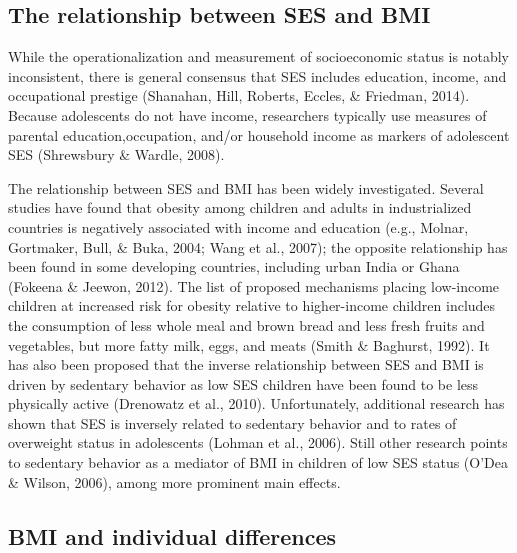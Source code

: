 \documentclass[man]{apa6}
\begin{document}
\hypertarget{the-relationship-between-ses-and-bmi}{%
\subsection{The relationship between SES and BMI}\label{the-relationship-between-ses-and-bmi}}

While the operationalization and measurement of socioeconomic status is notably inconsistent, there is general consensus that SES includes education, income, and occupational prestige (Shanahan, Hill, Roberts, Eccles, \& Friedman, 2014). Because adolescents do not have income, researchers typically use measures of parental education,occupation, and/or household income as markers of adolescent SES (Shrewsbury \& Wardle, 2008).

The relationship between SES and BMI has been widely investigated. Several studies have found that obesity among children and adults in industrialized countries is negatively associated with income and education (e.g., Molnar, Gortmaker, Bull, \& Buka, 2004; Wang et al., 2007); the opposite relationship has been found in some developing countries, including urban India or Ghana (Fokeena \& Jeewon, 2012). The list of proposed mechanisms placing low-income children at increased risk for obesity relative to higher-income children includes the consumption of less whole meal and brown bread and less fresh fruits and vegetables, but more fatty milk, eggs, and meats (Smith \& Baghurst, 1992). It has also been proposed that the inverse relationship between SES and BMI is driven by sedentary behavior as low SES children have been found to be less physically active (Drenowatz et al., 2010). Unfortunately, additional research has shown that SES is inversely related to sedentary behavior and to rates of overweight status in adolescents (Lohman et al., 2006). Still other research points to sedentary behavior as a mediator of BMI in children of low SES status (O'Dea \& Wilson, 2006), among more prominent main effects.

\hypertarget{bmi-and-individual-differences}{%
\subsection{BMI and individual differences}\label{bmi-and-individual-differences}}
\end{document}
